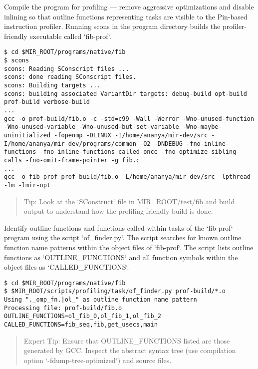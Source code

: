 \documentclass[11pt,a4paper]{article}
\begin{document}
Compile the program for profiling ---  remove aggressive optimizations and disable inlining so that outline functions representing tasks are visible to the Pin-based instruction profiler. Running scons in the program directory builds the profiler-friendly executable called `fib-prof`.  

\begin{lstlisting}[style=MyInputStyle]
$ cd $MIR_ROOT/programs/native/fib
$ scons 
scons: Reading SConscript files ...
scons: done reading SConscript files.
scons: Building targets ...
scons: building associated VariantDir targets: debug-build opt-build prof-build verbose-build
...
gcc -o prof-build/fib.o -c -std=c99 -Wall -Werror -Wno-unused-function -Wno-unused-variable -Wno-unused-but-set-variable -Wno-maybe-uninitialized -fopenmp -DLINUX -I/home/ananya/mir-dev/src -I/home/ananya/mir-dev/programs/common -O2 -DNDEBUG -fno-inline-functions -fno-inline-functions-called-once -fno-optimize-sibling-calls -fno-omit-frame-pointer -g fib.c
...
gcc -o fib-prof prof-build/fib.o -L/home/ananya/mir-dev/src -lpthread -lm -lmir-opt
\end{lstlisting}
    
\begin{framed}
\begin{quote}
Tip: Look at the `SConstruct` file in MIR\_ROOT/test/fib and build output to understand how the profiling-friendly build is done.
\end{quote}
\end{framed}

Identify outline functions and functions called within tasks of the `fib-prof` program using the script `of\_finder.py`. The script searches for known outline function name patterns within the object files of `fib-prof`. The script lists outline functions as `OUTLINE\_FUNCTIONS` and all function symbols within the object files as `CALLED\_FUNCTIONS`.

\begin{lstlisting}[style=MyInputStyle]
$ cd $MIR_ROOT/programs/native/fib
$ $MIR_ROOT/scripts/profiling/task/of_finder.py prof-build/*.o
Using "._omp_fn.|ol_" as outline function name pattern
Processing file: prof-build/fib.o
OUTLINE_FUNCTIONS=ol_fib_0,ol_fib_1,ol_fib_2
CALLED_FUNCTIONS=fib_seq,fib,get_usecs,main
\end{lstlisting}

\begin{framed}
\begin{quote}
Expert Tip: Ensure that OUTLINE\_FUNCTIONS listed are those generated by GCC. Inspect the abstract syntax tree (use compilation option `-fdump-tree-optimized`) and source files.
\end{quote}
\end{framed}
\end{document}
